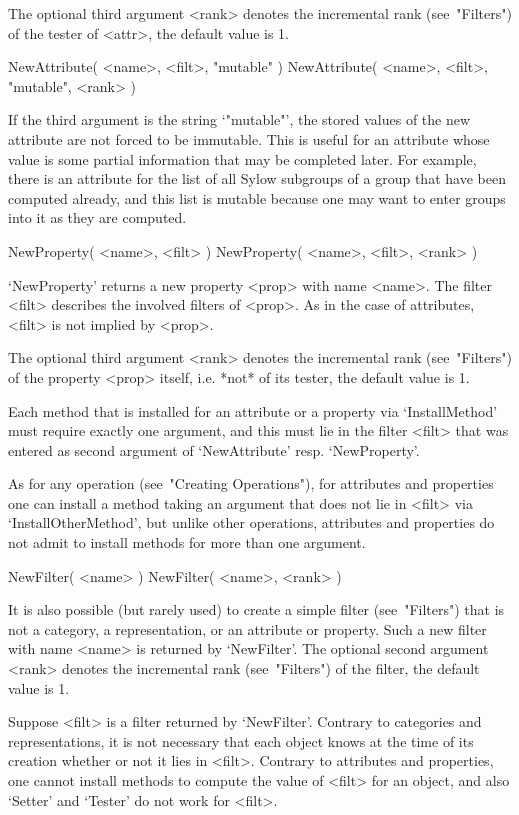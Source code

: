 The optional third argument <rank> denotes the incremental rank
(see~"Filters") of the tester of <attr>, the default value is 1.

\>NewAttribute( <name>, <filt>, "mutable" )
\)NewAttribute( <name>, <filt>, "mutable", <rank> )

If the third argument is the string `"mutable"', the stored values of the
new attribute are not forced to be immutable.
This is useful for an attribute whose value is some partial information
that may be completed later.
For example, there is an attribute for the list of all Sylow subgroups
of a group that have been computed already,
and this list is mutable because one may want to enter groups into it
as they are computed.

\>NewProperty( <name>, <filt> )
\)NewProperty( <name>, <filt>, <rank> )

`NewProperty' returns a new property <prop> with name <name>.
The filter <filt> describes the involved filters of <prop>.
As in the case of attributes, <filt> is not implied by <prop>.

The optional third argument <rank> denotes the incremental rank
(see~"Filters") of the property <prop> itself, i.e. *not* of its tester,
the default value is 1.

Each method that is installed for an attribute or a property
via `InstallMethod' must require exactly one argument,
and this must lie in the filter <filt> that was entered as second
argument of `NewAttribute' resp. `NewProperty'.

As for any operation (see~"Creating Operations"),
for attributes and properties one can install a method taking an argument
that does not lie in <filt> via `InstallOtherMethod',
but unlike other operations, attributes and properties do not admit
to install methods for more than one argument.



\>NewFilter( <name> )
\)NewFilter( <name>, <rank> )

It is also possible (but rarely used) to create a simple filter
(see~"Filters") that is not a category, a representation,
or an attribute or property.
Such a new filter with name <name> is returned by `NewFilter'.
The optional second argument <rank> denotes the incremental rank
(see~"Filters") of the filter, the default value is 1.

Suppose <filt> is a filter returned by `NewFilter'.
Contrary to categories and representations, it is not necessary that
each object knows at the time of its creation whether or not it lies in
<filt>.
Contrary to attributes and properties, one cannot install methods to
compute the value of <filt> for an object, and also `Setter' and
`Tester' do not work for <filt>.

